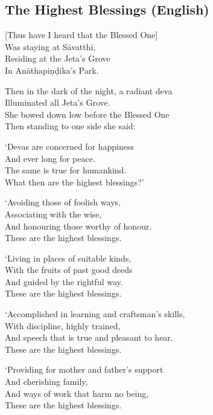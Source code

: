 
\subsection{The Highest Blessings (English)}


\begin{leader}
\end{leader}

[Thus have I heard that the Blessed One]\\
Was staying at Sāvatthī,\\
Residing at the Jeta's Grove\\
In Anāthapiṇḍika's Park.

Then in the dark of the night, a radiant deva\\
Illuminated all Jeta's Grove.\\
She bowed down low before the Blessed One\\
Then standing to one side she said:

`Devas are concerned for happiness\\
And ever long for peace.\\
The same is true for humankind.\\
What then are the highest blessings?'

`Avoiding those of foolish ways,\\
Associating with the wise,\\
And honouring those worthy of honour.\\
These are the highest blessings.

`Living in places of suitable kinds,\\
With the fruits of past good deeds\\
And guided by the rightful way.\\
These are the highest blessings.

`Accomplished in learning and craftsman's skills,\\%
With discipline, highly trained,\\
And speech that is true and pleasant to hear.\\
These are the highest blessings.

`Providing for mother and father's support\\
And cherishing family,\\
And ways of work that harm no being,\\
These are the highest blessings.

